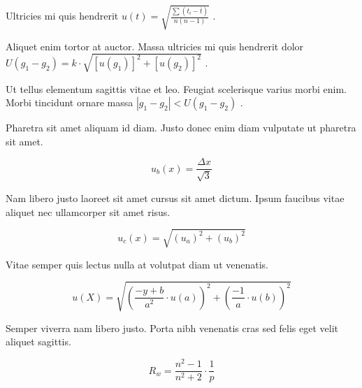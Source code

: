 \documentclass{article}
\begin{document}
Ultricies mi quis hendrerit 
\begin{math}
	u(t)=\sqrt{\frac{\sum(t_i-\overline{t})}{n(n-1)}}
\end{math}
.\newline

Aliquet enim tortor at auctor. Massa ultricies mi quis hendrerit dolor 
$ U(g_1-g_2)=k\cdot \sqrt{[u(g_1)]^2+[u(g_2)]^2} $
.\newline

Ut tellus elementum sagittis vitae et leo. Feugiat scelerisque varius morbi enim. Morbi tincidunt ornare massa
 \( |g_1-g_2|<U(g_1-g_2) \)
 .\newline

Pharetra sit amet aliquam id diam. Justo donec enim diam vulputate ut pharetra sit amet.

\[ u_b(x)=\frac{\Delta x}{\sqrt{3}} \]

Nam libero justo laoreet sit amet cursus sit amet dictum. Ipsum faucibus vitae aliquet nec ullamcorper sit amet risus.

$$ u_c(x)=\sqrt{(u_a)^2+(u_b)^2} $$

Vitae semper quis lectus nulla at volutpat diam ut venenatis.

\begin{displaymath}
	u(X)=\sqrt{(\frac{-y+b}{a^2}\cdot u(a))^2+(\frac{-1}{a}\cdot u(b))^2}
\end{displaymath}

Semper viverra nam libero justo. Porta nibh venenatis cras sed felis eget velit aliquet sagittis.

\begin{equation}
	R_w=\frac{n^2-1}{n^2+2} \cdot \frac{1}{p}
\end{equation}
\end{document}
